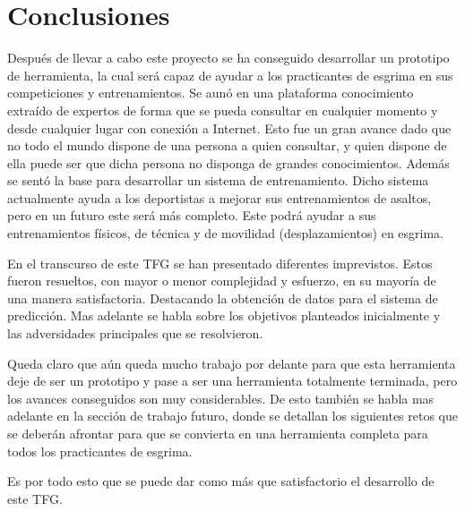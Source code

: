 \chapter{Conclusiones}
\label{cap:Conclusiones}

Después de llevar a cabo este proyecto se ha conseguido desarrollar un prototipo de herramienta,
la cual será capaz de ayudar a los practicantes de esgrima en sus competiciones y entrenamientos.
Se aunó en una plataforma conocimiento extraído de expertos de forma que se pueda consultar
en cualquier momento y desde cualquier lugar con conexión a Internet. Esto fue un gran avance
dado que no todo el mundo dispone de una persona a quien consultar, y quien dispone de ella
puede ser que dicha persona no disponga de grandes conocimientos. Además se sentó la base para
desarrollar un sistema de entrenamiento. Dicho sistema actualmente ayuda a los deportistas
a mejorar sus entrenamientos de asaltos, pero en un futuro este será más completo. Este podrá
ayudar a sus entrenamientos físicos, de técnica y de movilidad (desplazamientos) en esgrima.

En el transcurso de este \acs{TFG} se han presentado diferentes imprevistos. Estos fueron resueltos,
con mayor o menor complejidad y esfuerzo, en su mayoría de una manera satisfactoria. Destacando
la obtención de datos para el sistema de predicción. Mas adelante
se habla sobre los objetivos planteados inicialmente y las adversidades principales que se resolvieron.

Queda claro que aún queda mucho trabajo por delante para que esta herramienta deje de ser un prototipo
y pase a ser una herramienta totalmente terminada, pero los avances conseguidos son muy considerables.
De esto también se habla mas adelante en la sección de trabajo futuro, donde se detallan los siguientes
retos que se deberán afrontar para que se convierta en una herramienta completa para todos los practicantes
de esgrima.

Es por todo esto que se puede dar como más que satisfactorio el desarrollo de este \acs{TFG}.




